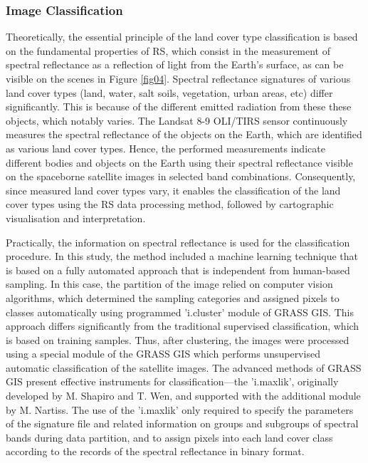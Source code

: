 \documentclass[land,article,accept,pdftex,moreauthors]{Definitions/mdpi}
\begin{document}
\subsubsection{Image Classification}

Theoretically, the essential  principle of the land cover type classification is based on the fundamental properties of RS, which consist in the measurement of spectral reflectance as a reflection of light from the Earth's surface, as can be visible on the scenes in Figure \ref{fig04}. Spectral reflectance signatures of various land cover types (land, water, salt soils, vegetation, urban areas, etc) differ significantly. This is because of the different emitted radiation from these these objects, which {notably} varies. The Landsat 8-9 OLI/TIRS sensor continuously measures {the }spectral reflectance of the objects on the Earth, which are identified as various land cover types. Hence, the performed measurements indicate {different} bodies and objects on the Earth using their spectral reflectance visible on the spaceborne satellite images in selected band combinations. Consequently, since measured land cover types {vary}, it enables the classification of the land cover types using the RS data processing {method}, followed by cartographic visualisation and interpretation. 

Practically, the information on spectral reflectance is used for the classification procedure. {In this study, the method included a machine learning technique that is based on a fully automated approach that is independent from human-based sampling. In this case, the partition of the image relied on computer vision algorithms, which determined the sampling categories and assigned pixels to classes automatically using programmed 'i.cluster' module of GRASS GIS. This approach differs significantly from the traditional supervised classification, which is based on training samples. }Thus, after clustering, the images were processed using a special module of the GRASS GIS which performs unsupervised automatic classification of the satellite images. The advanced methods of GRASS GIS present effective instruments for classification---the 'i.maxlik', {originally }developed by M. Shapiro and T. Wen, and supported with the additional module by M. Nartiss. The use of the 'i.maxlik' only required to specify the parameters of the signature file and related information on groups and subgroups of spectral bands during data partition, and to assign pixels into each land cover class according to the records of the spectral reflectance in binary format. 
\end{document}
